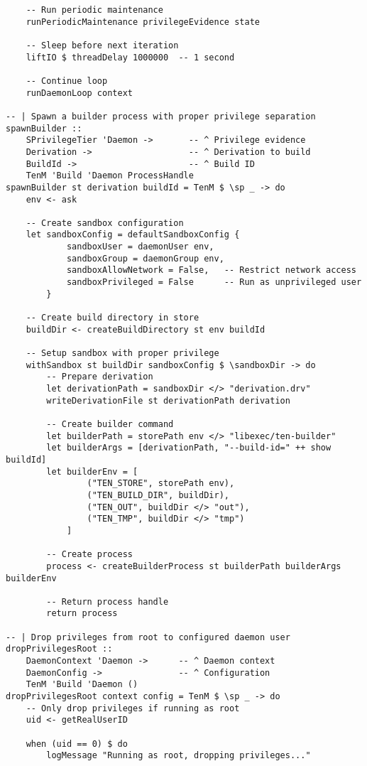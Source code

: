 \documentclass{article}
\begin{document}
\begin{tcolorbox}[title=Ten/Daemon/Core.hs Changes]
\begin{verbatim}
    -- Run periodic maintenance
    runPeriodicMaintenance privilegeEvidence state

    -- Sleep before next iteration
    liftIO $ threadDelay 1000000  -- 1 second

    -- Continue loop
    runDaemonLoop context

-- | Spawn a builder process with proper privilege separation
spawnBuilder ::
    SPrivilegeTier 'Daemon ->       -- ^ Privilege evidence
    Derivation ->                   -- ^ Derivation to build
    BuildId ->                      -- ^ Build ID
    TenM 'Build 'Daemon ProcessHandle
spawnBuilder st derivation buildId = TenM $ \sp _ -> do
    env <- ask

    -- Create sandbox configuration
    let sandboxConfig = defaultSandboxConfig {
            sandboxUser = daemonUser env,
            sandboxGroup = daemonGroup env,
            sandboxAllowNetwork = False,   -- Restrict network access
            sandboxPrivileged = False      -- Run as unprivileged user
        }

    -- Create build directory in store
    buildDir <- createBuildDirectory st env buildId

    -- Setup sandbox with proper privilege
    withSandbox st buildDir sandboxConfig $ \sandboxDir -> do
        -- Prepare derivation
        let derivationPath = sandboxDir </> "derivation.drv"
        writeDerivationFile st derivationPath derivation

        -- Create builder command
        let builderPath = storePath env </> "libexec/ten-builder"
        let builderArgs = [derivationPath, "--build-id=" ++ show buildId]
        let builderEnv = [
                ("TEN_STORE", storePath env),
                ("TEN_BUILD_DIR", buildDir),
                ("TEN_OUT", buildDir </> "out"),
                ("TEN_TMP", buildDir </> "tmp")
            ]

        -- Create process
        process <- createBuilderProcess st builderPath builderArgs builderEnv

        -- Return process handle
        return process

-- | Drop privileges from root to configured daemon user
dropPrivilegesRoot ::
    DaemonContext 'Daemon ->      -- ^ Daemon context
    DaemonConfig ->               -- ^ Configuration
    TenM 'Build 'Daemon ()
dropPrivilegesRoot context config = TenM $ \sp _ -> do
    -- Only drop privileges if running as root
    uid <- getRealUserID

    when (uid == 0) $ do
        logMessage "Running as root, dropping privileges..."


\end{verbatim}
\end{tcolorbox}
\end{document}
